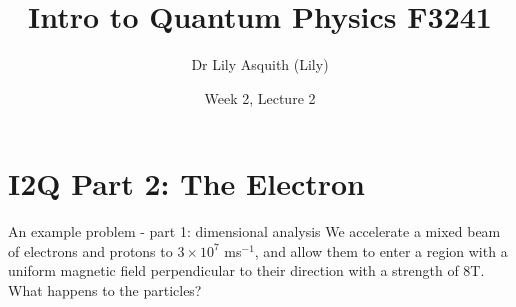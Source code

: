 


% 
\title[ Intro to Quantum Physics]{Intro to Quantum Physics F3241}
\author[Dr Lily Asquith (Lily)]{ Dr Lily Asquith (Lily)}
\date[Week 2]{ Week 2, Lecture 2}





\begin{frame}
\titlepage
\end{frame} 

\section{I2Q Part 2: The Electron}

 
 


\begin{frame}{An example problem - part 1: dimensional analysis}
\small
We accelerate a mixed beam of electrons and protons to $3 \times 10^7$ ms$^{-1}$, and allow them to enter a region with a uniform magnetic field perpendicular to their direction with a strength of 8T. What happens to the particles?\\[21ex]

%
%
%
\end{frame}

